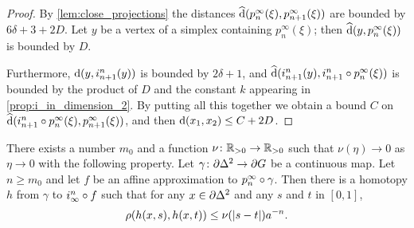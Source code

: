 \documentclass[a4paper]{article}
\begin{document}
\begin{proof}
  By \cref{lem:close_projections} the distances $\operatorname{\widehat{d}}(p^\infty_n(\xi),
  p^\infty_{n+1}(\xi))$ are bounded by $6\delta + 3 + 2D$. Let $y$ be a vertex
  of a simplex containing $p^\infty_n(\xi)$; then $\operatorname{\widehat{d}}(y, p^\infty_n(\xi))$
  is bounded by $D$.
  
  Furthermore, $\operatorname{d}(y, i^n_{n+1}(y))$ is bounded by $2\delta+1$, and
  $\operatorname{\widehat{d}}(i^n_{n+1}(y), i^n_{n+1}\circ p^\infty_n (\xi))$ is bounded by
  the product of $D$ and the constant $k$ appearing in
  \cref{prop:i_in_dimension_2}. By putting all this together we obtain a bound
  $C$ on $\operatorname{\widehat{d}}(i^n_{n+1}\circ p^\infty_n(\xi), p^\infty_{n+1}(\xi))$,
  and then $\operatorname{d}(x_1, x_2) \leq C + 2D$.
\end{proof}

\begin{proposition}\label{prop:uniform_homotopies}
  There exists a number $m_0$ and a function $\nu\colon\mathbb{R}_{>0}\to\mathbb{R}_{>0}$ such
  that $\nu(\eta)\to0$ as $\eta\to0$ with the following property. Let
  $\gamma\colon\partial\Delta^2\to\partial G$ be a continuous map. Let $n
  \geq m_0$ and let $f$ be an affine approximation to
  $p^\infty_n\circ\gamma$. Then there is a homotopy $h$ from $\gamma$ to
  $i^n_\infty\circ f$ such that for any $x \in \partial\Delta^2$ and
  any $s$ and $t$ in $[0,1]$,
  \begin{equation*}
    \rho(h(x,s), h(x,t)) \leq \nu(\left|s-t\right|) a^{-n}.
  \end{equation*}
\end{proposition}
\end{document}
